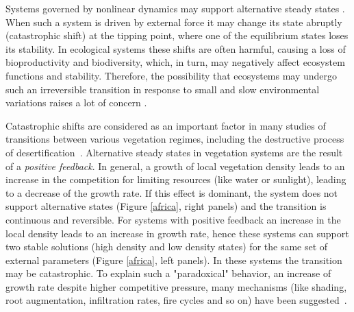 \documentclass[aps,pre,twocolumn]{revtex4-1}
\begin{document}
Systems governed by nonlinear dynamics may support alternative steady states \cite{scheffer2001catastrophic}. When such a system is driven by external force it may change its state abruptly (catastrophic shift) at the tipping point, where one of the equilibrium states loses its stability. In ecological systems these shifts are often harmful, causing a loss of bioproductivity and biodiversity, which, in turn, may negatively affect ecosystem functions and  stability. Therefore, the possibility that ecosystems may undergo such an irreversible transition  in response to small and slow environmental variations raises a lot of concern \cite{staal2015synergistic, nes2014tipping,reyer2015forest,baudena2015forests,martinez2016drought,eby2017alternative}.

Catastrophic shifts are considered as an important factor in many studies of  transitions between various vegetation regimes, including the destructive process of desertification~\cite{noy1975stability,foley2003regime,janssen2008microscale,sankaran2005determinants}.
Alternative steady states in vegetation systems are the result of a \emph{positive feedback}. In general, a growth of local vegetation density leads to an increase in the competition for limiting resources (like water or sunlight), leading to a decrease of the growth rate. If this effect is dominant, the system does not support alternative states (Figure \ref{africa}, right panels) and the transition is continuous and reversible.  For systems with positive feedback an  increase in the local density leads to an increase in growth rate, hence these systems can support two stable solutions (high density and low density states) for the same set of external parameters (Figure \ref{africa}, left panels). In these systems the  transition may be catastrophic. To explain such a "paradoxical" behavior, an increase of growth rate  despite higher competitive pressure, many  mechanisms (like shading, root augmentation, infiltration rates, fire cycles and so on) have been suggested~\cite{meron2012pattern,gilad2004ecosystem,adams2013mega,tredennick2015effects}.
\end{document}
